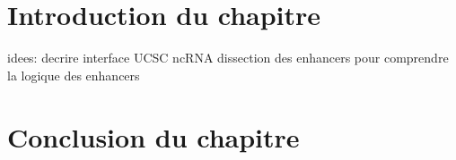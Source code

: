 \section*{Introduction du chapitre \thechapter}

idees: decrire interface UCSC
ncRNA
dissection des enhancers pour comprendre la logique des enhancers

\newpage
\section{}

			
\newpage	
			
\section*{Conclusion du chapitre \thechapter}
